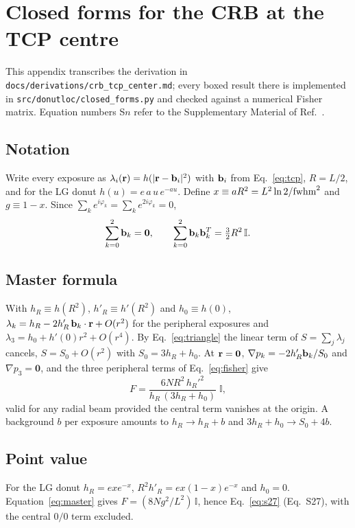 \section{Closed forms for the CRB at the TCP centre}\label{app:derivation}

This appendix transcribes the derivation in \nolinkurl{docs/derivations/crb_tcp_center.md}; every boxed result there is implemented in
\nolinkurl{src/donutloc/closed_forms.py} and checked against a numerical Fisher matrix. Equation numbers S$n$ refer to the Supplementary Material of
Ref.~\cite{Balzarotti2017}.

\subsection{Notation}
Write every exposure as $\lambda_i(\mathbf{r})=h(|\mathbf{r}-\mathbf{b}_i|^2)$ with $\mathbf{b}_i$ from Eq.~\eqref{eq:tcp},
$R=L/2$, and for the LG donut $h(u)=e\,a\,u\,e^{-au}$. Define $x\equiv aR^2=L^2\ln2/\mathrm{fwhm}^2$ and
$g\equiv1-x$. Since $\sum_ke^{i\varphi_k}=\sum_ke^{2i\varphi_k}=0$,
\begin{equation}
\sum_{k=0}^{2}\mathbf{b}_k=\mathbf0,\qquad\sum_{k=0}^{2}\mathbf{b}_k\mathbf{b}_k^{T}=\tfrac32R^2\,\mathbb{I} .
\label{eq:triangle}
\end{equation}

\subsection{Master formula}
With $h_R\equiv h(R^2)$, $h'_R\equiv h'(R^2)$ and $h_0\equiv h(0)$,
$\lambda_k=h_R-2h'_R\,\mathbf{b}_k\cdot\mathbf{r}+O(r^2)$ for the peripheral exposures and
$\lambda_3=h_0+h'(0)r^2+O(r^4)$. By Eq.~\eqref{eq:triangle} the linear term of
$S=\sum_j\lambda_j$ cancels, $S=S_0+O(r^2)$ with $S_0=3h_R+h_0$. At $\mathbf{r}=\mathbf0$,
$\nabla p_k=-2h'_R\mathbf{b}_k/S_0$ and $\nabla p_3=\mathbf0$, and the three peripheral terms of
Eq.~\eqref{eq:fisher} give
\begin{equation}
F=\frac{6NR^2\,h_R'^2}{h_R\,(3h_R+h_0)}\;\mathbb{I} ,
\label{eq:master}
\end{equation}
valid for any radial beam provided the central term vanishes at the origin. A background $b$
per exposure amounts to $h_R\to h_R+b$ and $3h_R+h_0\to S_0+4b$.

\subsection{Point value}
For the LG donut $h_R=exe^{-x}$, $R^2h'_R=ex(1-x)e^{-x}$ and $h_0=0$. Equation~\eqref{eq:master}
gives $F=(8Ng^2/L^2)\,\mathbb{I}$, hence Eq.~\eqref{eq:s27} (Eq.~S27), with the central $0/0$ term
excluded.

